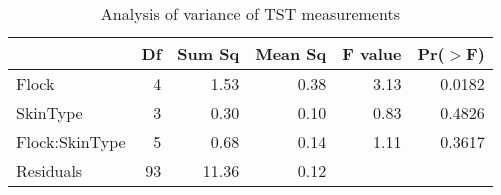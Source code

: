 \begin{table}[ht]
\caption{Analysis of variance of TST measurements}
\label{tab:tstaov}
\centering
\begin{tabular}{lrrrrr}
  \hline
 & Df & Sum Sq & Mean Sq & F value & Pr($>$F) \\ 
  \hline
Flock          & 4 & 1.53 & 0.38 & 3.13 & 0.0182 \\ 
  SkinType       & 3 & 0.30 & 0.10 & 0.83 & 0.4826 \\ 
  Flock:SkinType & 5 & 0.68 & 0.14 & 1.11 & 0.3617 \\ 
  Residuals      & 93 & 11.36 & 0.12 &  &  \\ 
   \hline
\end{tabular}
\end{table}

